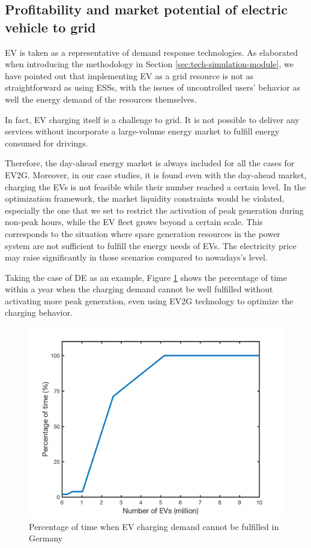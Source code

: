 \subsection[Profitability and market potential of electric vehicle to grid]{Profitability and market potential of electric vehicle to grid%
	}

EV is taken as a representative of demand response technologies. As elaborated when introducing the methodology in Section \ref{sec:tech-simulation-module}, we have pointed out that implementing EV as a grid resource is not as straightforward as using ESSs, with the issues of uncontrolled users' behavior as well the energy demand of the resources themselves.  

In fact, EV charging itself is a challenge to grid. It is not possible to deliver any services without incorporate a large-volume energy market to fulfill energy consumed for drivings. 

Therefore, the day-ahead energy market is always included for all the cases for EV2G. Moreover, in our case studies, it is found even with the day-ahead market, charging the EVs is not feasible while their number reached a certain level. In the optimization framework, the market liquidity constraints would be violated, especially the one that we set to restrict the activation of peak generation during non-peak hours, while the EV fleet grows beyond a certain scale. This corresponds to the situation where spare generation resources in the power system are not sufficient  to fulfill the energy needs of EVs. The electricity price may raise significantly in those scenarios compared to nowadays's level.

Taking the case of DE as an example, Figure \ref{fig:EV_nan_percentageg} shows the percentage of time within a year when the charging demand cannot be well fulfilled without activating more peak generation, even using EV2G technology to optimize the charging behavior.

\begin{figure}[h!]
	\centering
	\includegraphics[width=0.95\linewidth]{Figures/EV_nan_percentage}
	\caption{Percentage of time when EV charging demand cannot be fulfilled in Germany}
	\label{fig:EV_nan_percentageg}
\end{figure}

